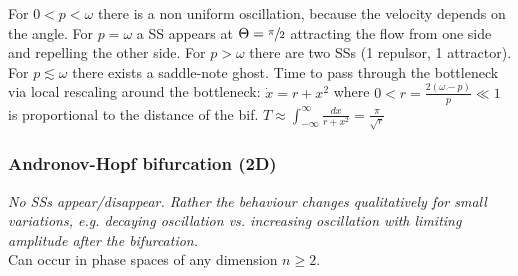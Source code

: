 For $0<p<\omega$ there is a non uniform oscillation, because the velocity depends on the angle. For $p=\omega$ a SS appears at $\Theta=\sfrac{\pi}{2}$ attracting the flow from one side and repelling the other side. For $p>\omega$ there are two SSs (1 repulsor, 1 attractor).\\
For $p\lesssim\omega$ there exists a saddle-note ghost. Time to pass through the bottleneck via local rescaling around the bottleneck: $\dot{x}=r+x^2$ where $0<r = \frac{2(\omega-p)}{p}\ll 1$ is proportional to the distance of the bif. $T\approx
\int_{-\infty}^{\infty} \frac{dx}{r+x^2} = \frac{\pi}{\sqrt{r}}$

\begin{center}
\end{center}

\subsubsection{Andronov-Hopf bifurcation (2D)}
\emph{No SSs appear/disappear. Rather the behaviour changes qualitatively for small variations, e.g. decaying oscillation vs. increasing oscillation with limiting amplitude after the bifurcation.}\\
Can occur in phase spaces of any dimension $n\geq 2$.

